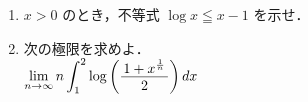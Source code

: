 ﻿\documentclass[../../../uem_tok_q.tex]{subfiles}
\begin{document}
    \begin{enumerate}
        \item $x>0$ のとき，不等式 $\log x\leqq x-1$ を示せ．
        \item 次の極限を求めよ．\\
            \hspace{3\zw}%
            $\displaystyle%
                \lim_{n\to\infty}n\int_1^2\log\left(%
                \myfraca{1+x^{\frac{1}{\raisebox{1pt}{$\scriptscriptstyle n$}}}}{2}\right)dx%
            $
    \end{enumerate}
\end{document}
